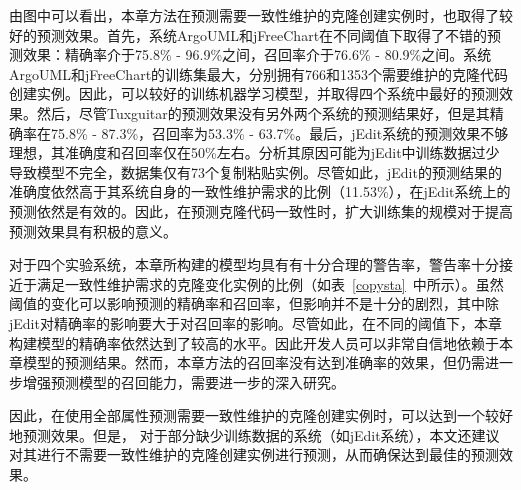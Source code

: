由图中可以看出，本章方法在预测需要一致性维护的克隆创建实例时，也取得了较好的预测效果。首先，系统ArgoUML和jFreeChart在不同阈值下取得了不错的预测效果：精确率介于75.8\% - 96.9\%之间，召回率介于76.6\% - 80.9\%之间。系统ArgoUML和jFreeChart的训练集最大，分别拥有766和1353个需要维护的克隆代码创建实例。因此，可以较好的训练机器学习模型，并取得四个系统中最好的预测效果。然后，尽管Tuxguitar的预测效果没有另外两个系统的预测结果好，但是其精确率在75.8\% - 87.3\%，召回率为53.3\% - 63.7\%。最后，jEdit系统的预测效果不够理想，其准确度和召回率仅在50\%左右。分析其原因可能为jEdit中训练数据过少导致模型不完全，数据集仅有73个复制粘贴实例。尽管如此，jEdit的预测结果的准确度依然高于其系统自身的一致性维护需求的比例（11.53\%），在jEdit系统上的预测依然是有效的。因此，在预测克隆代码一致性时，扩大训练集的规模对于提高预测效果具有积极的意义。

对于四个实验系统，本章所构建的模型均具有有十分合理的警告率，警告率十分接近于满足一致性维护需求的克隆变化实例的比例（如表~\ref {copysta}~中所示）。虽然阈值的变化可以影响预测的精确率和召回率，但影响并不是十分的剧烈，其中除jEdit对精确率的影响要大于对召回率的影响。尽管如此，在不同的阈值下，本章构建模型的精确率依然达到了较高的水平。因此开发人员可以非常自信地依赖于本章模型的预测结果。然而，本章方法的召回率没有达到准确率的效果，但仍需进一步增强预测模型的召回能力，需要进一步的深入研究。

因此，在使用全部属性预测需要一致性维护的克隆创建实例时，可以达到一个较好地预测效果。但是， 对于部分缺少训练数据的系统（如jEdit系统），本文还建议对其进行不需要一致性维护的克隆创建实例进行预测，从而确保达到最佳的预测效果。

